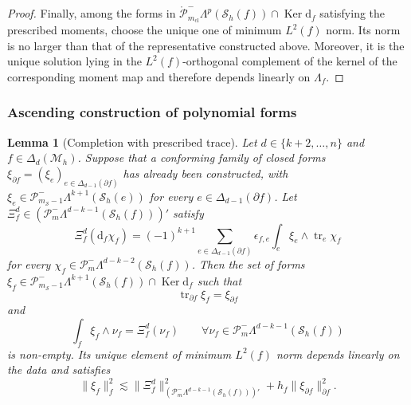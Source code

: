 \documentclass[a4paper,11pt]{article}
\newtheorem{lemma}[theorem]{Lemma}
\theoremstyle{definition}
\newcommand{\DIFF}{\mathrm{d}}
\newcommand{\Mh}{\mathcal{M}_h}
\newcommand{\Sh}{\mathcal{S}_h}
\newcommand{\FM}[1]{\Delta_{#1}}
\newcommand{\PLtrim}[2]{\mathcal{P}_{#1}^{-}\Lambda^{#2}}
\newcommand{\trc}{\operatorname{tr}}
\newcommand{\Ker}{\operatorname{Ker}}
\newcommand{\PLtrimz}[2]{\mathring{\mathcal P}_{#1}^{-}\Lambda^{#2}}
\begin{document}
\begin{proof}
Finally, among the forms in $\PLtrimz{m_{\mathrm{cl}}}{p}(\Sh(f))\cap\Ker\DIFF_f$ satisfying the prescribed moments, choose the unique one of minimum $L^2(f)$ norm.
Its norm is no larger than that of the representative constructed above.
Moreover, it is the unique solution lying in the $L^2(f)$-orthogonal complement of the kernel of the corresponding moment map and therefore depends linearly on $\Lambda_f$.
\end{proof}

\subsubsection{Ascending construction of polynomial forms}
\label{subsubsec:upward}

\begin{lemma}[Completion with prescribed trace]
\label{lem:closed.moment.completion}
Let $d\in\{k+2,\ldots,n\}$ and $f\in\FM{d}(\Mh)$.
Suppose that a conforming family of closed forms $\xi_{\partial f}=(\xi_e)_{e\in\FM{d-1}(\partial f)}$ has already been constructed, with $\xi_e\in\PLtrim{m_{\mathcal S}-1}{k+1}(\Sh(e))$ for every $e\in\FM{d-1}(\partial f)$.
Let $\Xi_f^d\in(\PLtrim{m}{d-k-1}(\Sh(f)))'$ satisfy
\begin{equation}\label{eq:closed.moment.compatibility}
\Xi_f^d(\DIFF_f\chi_f)
=(-1)^{k+1}
\sum_{e\in\FM{d-1}(\partial f)}
\epsilon_{f,e}
\int_e\xi_e\wedge\trc_e\chi_f
\end{equation}
for every $\chi_f\in\PLtrim{m}{d-k-2}(\Sh(f))$.
Then the set of forms $\xi_f\in \PLtrim{m_{\mathcal S}-1}{k+1}(\Sh(f))\cap\Ker\DIFF_f$ such that
\[
  \trc_{\partial f}\xi_f=\xi_{\partial f}
\]
and
\[
  \int_f\xi_f\wedge\nu_f
  =
  \Xi_f^d(\nu_f)
  \qquad
  \forall\nu_f\in\PLtrim{m}{d-k-1}(\Sh(f))
\]
is non-empty.
Its unique element of minimum $L^2(f)$ norm depends linearly on the data and satisfies
\begin{equation}\label{eq:closed.moment.completion.stability}
  \|\xi_f\|_f^2
  \lesssim
  \|\Xi_f^d\|_{\left(\PLtrim{m}{d-k-1}(\Sh(f))\right)'}^2
  +
  h_f\|\xi_{\partial f}\|_{\partial f}^2.
\end{equation}
\end{lemma}
\end{document}
